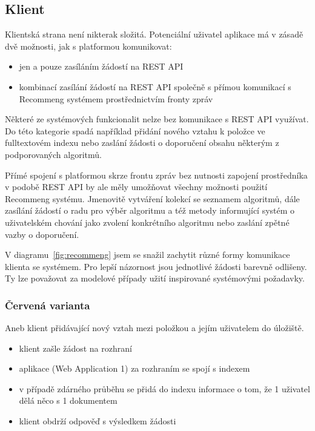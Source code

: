 \documentclass[thesis=M,czech]{FITthesis}[2014/05/07]
\begin{document}
\subsection{Klient}

Klientská strana není nikterak složitá. Potenciální uživatel aplikace má v zásadě dvě možnosti, jak s platformou komunikovat:

\begin{itemize}
	\item jen a pouze zasíláním žádostí na REST API
	\item kombinací zasílání žádostí na REST API společně s přímou komunikací s Recommeng systémem prostřednictvím fronty zpráv
\end{itemize}

Některé ze systémových funkcionalit nelze bez komunikace s REST API využívat. Do této kategorie spadá například přidání nového vztahu k položce ve fulltextovém indexu nebo zaslání žádosti o doporučení obsahu některým z podporovaných algoritmů. 

Přímé spojení s platformou skrze frontu zpráv bez nutnosti zapojení prostředníka v podobě REST API by ale měly umožňovat všechny možnosti použití Recommeng systému. Jmenovitě vytváření kolekcí se seznamem algoritmů, dále zasílání žádostí o radu pro výběr algoritmu a též metody informující systém o uživatelském chování jako zvolení konkrétního algoritmu nebo zaslání zpětné vazby o doporučení. 

V diagramu~\ref{fig:recommeng} jsem se snažil zachytit různé formy komunikace klienta se systémem. Pro lepší názornost jsou jednotlivé žádosti barevně odlišeny. Ty lze považovat za modelové případy užití inspirované systémovými požadavky.

\subsubsection{Červená varianta}

Aneb klient přidávající nový vztah mezi položkou a jejím uživatelem do úložiště.

\begin{itemize}
	\item klient zašle žádost na rozhraní
	\item aplikace (Web Application 1) za rozhraním se spojí s indexem
	\item v případě zdárného průběhu se přidá do indexu informace o tom, že 1 uživatel dělá něco s 1 dokumentem
	\item klient obdrží odpověď s výsledkem žádosti
\end{itemize}
\end{document}
